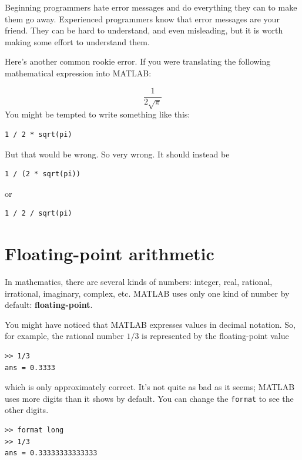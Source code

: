 \documentclass[
]{book}
\begin{document}
Beginning programmers hate error messages and do everything they
can to make them go away.  Experienced programmers know that error
messages are your friend.  They can be hard to understand, and even
misleading, but it is worth making some effort to understand them.

Here's another common rookie error.  If you were translating
the following mathematical
expression into MATLAB:

\begin{equation}
 \frac{1}{2 \sqrt \pi}
\end{equation}
You might be tempted to write something like this:

\begin{verbatim}
1 / 2 * sqrt(pi)
\end{verbatim}

But that would be wrong.  So very wrong.  It should instead be

\begin{verbatim}
1 / (2 * sqrt(pi))
\end{verbatim}

or

\begin{verbatim}
1 / 2 / sqrt(pi)
\end{verbatim}


\section{Floating-point arithmetic}

In mathematics, there are several kinds of numbers: integer, real,
rational, irrational, imaginary, complex, etc.  MATLAB uses only one
kind of number by default: {\bf floating-point}.

You might have noticed that MATLAB expresses values in decimal
notation.  So, for example, the rational number $1/3$ is represented
by the floating-point value

\begin{verbatim}
>> 1/3
ans = 0.3333
\end{verbatim}

which is only approximately correct.  It's not quite as bad as
it seems; MATLAB uses more digits than it shows by default.
You can change the {\tt format} to see the other digits.

\begin{verbatim}
>> format long
>> 1/3
ans = 0.33333333333333
\end{verbatim}
\end{document}

